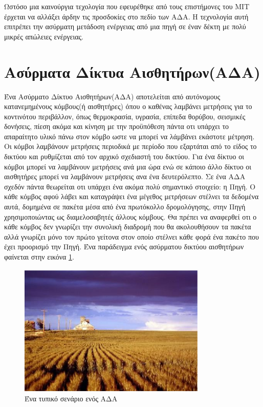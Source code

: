 Ωστόσο μια καινούργια τεχολογία που εφευρέθηκε από τους επιστήμονες του MIT \cite{power_mit_1} έρχεται να αλλάξει άρδην τις προσδοκίες στο πεδίο των ΑΔΑ. Η τεχνολογία
αυτή επιτρέπει την ασύρματη μετάδοση ενέργειας από μια πηγή σε έναν δέκτη με πολύ μικρές απώλειες ενέργειας. 






\section{Ασύρματα Δίκτυα Αισθητήρων(ΑΔΑ)}
Ένα Ασύρματο Δίκτυο Αισθητήρων(ΑΔΑ) αποτελείται από αυτόνομους κατανεμημένους κόμβους(ή αισθητήρες) όπου ο καθένας λαμβάνει μετρήσεις για το κοντινότου περιβάλλον,
όπως θερμοκρασία, υγρασία, επίπεδα θορύβου, σεισμικές δονήσεις, πίεση ακόμα και κίνηση με την προϋπόθεση πάντα οτι υπάρχει το απαραίτητο υλικό πάνω στον κόμβο ωστε
να μπορεί να λάμβάνει εκάστοτε μέτρηση.
Οι κόμβοι λαμβάνουν μετρήσεις περιοδικά με περίοδο που εξαρτάται από το είδος το δικτύου και ρυθμίζεται από τον αρχικό σχεδιαστή του δικτύου.
Για ένα δίκτυο οι κόμβοι μπορεί να λαμβάνουν μετρήσεις ανά μια ώρα ενώ σε κάποιο άλλο δίκτυο οι αισθητήρες μπορεί να λαμβάνουν μετρήσεις ανα ένα δευτερόλεπτο.
Σε ένα ΑΔΑ σχεδόν πάντα θεωρείται οτι υπάρχει ένα ακόμα πολύ σημαντικό στοιχείο: η Πηγή.
Ο κάθε κόμβος αφού λάβει και καταγράψει ένα μέγεθος μετρήσεων στέλνει τα δεδομένα αυτά, δομημένα σε πακέτα μέσα από ένα πρωτόκολλο δρομολόγησης, στην Πηγή
χρησιμοποιώντας ως διαμελοσαβητές άλλους κόμβους.
Θα πρέπει να αναφερθεί οτι ο κάθε κόμβος δεν γνωρίζει την συνολική διαδρομή που θα ακολουθήσουν τα πακέτα αλλά γνωρίζει μόνο τον πρώτο γείτονα στον οποίο στέλνει κάθε
φορά ένα πακέτο που έχει προορισμό την Πηγή. Ένα παράδειγμα ενός ασύρματου δικτύου αισθητήρων φαίνεται στην εικόνα \ref{fig:farm}.

\begin{figure}[h]
	\centering
	\includegraphics[width=0.8\textwidth]{images/farm.eps}
	\caption{Ένα τυπικό σενάριο ενός ΑΔΑ}
	\label{fig:farm}
\end{figure}

